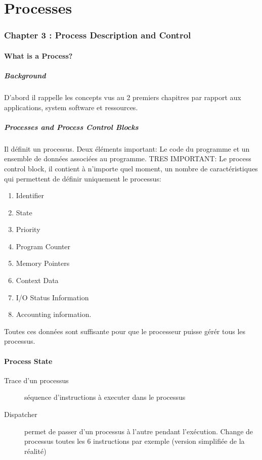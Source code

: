 \part{Processes}

\section{Chapter 3 : Process Description and Control}

\subsection{What is a Process?}
\subsubsection{Background}
D'abord il rappelle les concepts vus au 2 premiers chapitres par rapport aux applications, system software et ressources.
\subsubsection{Processes and Process Control Blocks}
Il définit un processus.
Deux éléments important: Le code du programme et un ensemble de données associées au programme.
TRES IMPORTANT: Le process control block, il contient à n'importe quel moment, un nombre de caractéristiques qui permettent de définir uniquement le processus:
\begin{enumerate}
  \item Identifier
  \item State
  \item Priority
  \item Program Counter
  \item Memory Pointers
  \item Context Data
  \item I/O Status Information
  \item Accounting information.
\end{enumerate}
Toutes ces données sont suffisante pour que le processeur puisse gérér tous les processus.

\subsection{Process State}
\begin{description}
  \item[Trace d'un processus] séquence d'instructions à executer dans le processus
  \item[Dispatcher] permet de passer d'un processus à l'autre pendant l'exécution.
    Change de processus toutes les 6 instructions par exemple (version simplifiée de la réalité)
\end{description}

